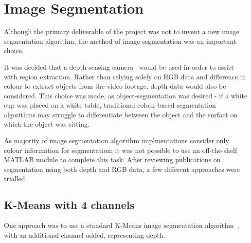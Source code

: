 \section{Image Segmentation}
Although the primary deliverable of the project was not to invent a new image segmentation algorithm, the method of image segmentation was an important choice.

It was decided that a depth-sensing camera~\cite{xtion} would be used in order to assist with region extraction. Rather than relying solely on RGB data and difference in colour to extract objects from the video footage, depth data would also be considered. This choice was made, as object-segmentation was desired - if a white cup was placed on a white table, traditional colour-based segmentation algorithms may struggle to differentiate between the object and the surfact on which the object was sitting.

As majority of image segmentation algorithm implmentations consider only colour information for segmentation; it was not possible to use an off-the-shelf MATLAB module to complete this task. After reviewing publications on segmentation using both depth and RGB data, a few different approaches were trialled.

\subsection{K-Means with 4 channels}

One approach was to use a standard K-Means image segmentation algorithm~\cite{kmeans-matlab}, with an additional channel added, representing depth. 
